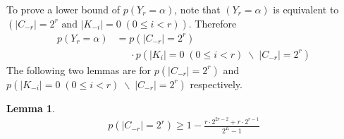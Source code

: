 \documentclass[10pt, conference, compsocconf]{IEEEtran}
\newtheorem{mylemma}{Lemma}
\begin{document}
        To prove a lower bound of $p(Y_r = \alpha)$, note that
        $(Y_r = \alpha)$ is equivalent to $\left(|C_{-r}| = 2^r \text{ and } |K_{-i}| = 0   \; (0 \leq i < r)\right)$.
        Therefore
        \begin{align*}
            p(Y_r = \alpha) &= p(|C_{-r}| = 2^r)\\
                & \;\;\;\;\; \cdot p(|K_i| = 0  \; (0 \leq i < r) \; \backslash \; |C_{-r}| = 2^r)
        \end{align*}
        The following two lemmas are for $p(|C_{-r}| = 2^r)$ and $p(|K_{-i}| = 0  \; (0 \leq i < r) \; \backslash \; |C_{-r}| = 2^r)$
        respectively.

        \begin{mylemma}
            \begin{align*}
                p(|C_{-r}| = 2^r) \geq 1-\frac{r \cdot 2^{2r-2}+r \cdot 2^{r-1}}{2^E-1}
            \end{align*}
        \end{mylemma}
\end{document}
